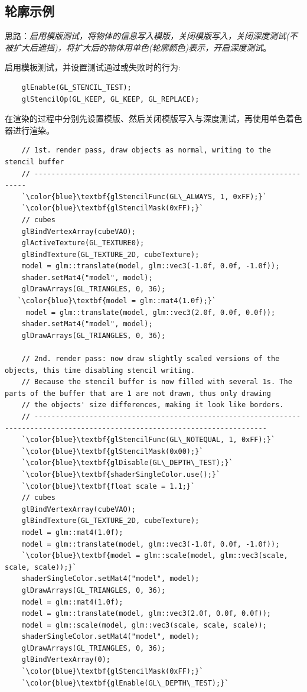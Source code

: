 \documentclass[UTF8,a4paper,12pt]{ctexbook}
\begin{document}
		\subsection{轮廓示例}
			思路：\textit{启用模版测试，将物体的信息写入模版，关闭模版写入，关闭深度测试(不被扩大后遮挡)，将扩大后的物体用单色(轮廓颜色)表示，开启深度测试}。
		
			
			启用模板测试，并设置测试通过或失败时的行为:	
			\begin{lstlisting}
	glEnable(GL_STENCIL_TEST);
	glStencilOp(GL_KEEP, GL_KEEP, GL_REPLACE);			
			\end{lstlisting}
			
			在渲染的过程中分别先设置模版、然后关闭模版写入与深度测试，再使用单色着色器进行渲染。
			\begin{lstlisting}
    // 1st. render pass, draw objects as normal, writing to the stencil buffer
    // --------------------------------------------------------------------
    `\color{blue}\textbf{glStencilFunc(GL\_ALWAYS, 1, 0xFF);}`
    `\color{blue}\textbf{glStencilMask(0xFF);}`
    // cubes
    glBindVertexArray(cubeVAO);
    glActiveTexture(GL_TEXTURE0);
    glBindTexture(GL_TEXTURE_2D, cubeTexture);
    model = glm::translate(model, glm::vec3(-1.0f, 0.0f, -1.0f));
    shader.setMat4("model", model);
    glDrawArrays(GL_TRIANGLES, 0, 36);
   `\color{blue}\textbf{model = glm::mat4(1.0f);}`
     model = glm::translate(model, glm::vec3(2.0f, 0.0f, 0.0f));
    shader.setMat4("model", model);
    glDrawArrays(GL_TRIANGLES, 0, 36);

    // 2nd. render pass: now draw slightly scaled versions of the objects, this time disabling stencil writing.
    // Because the stencil buffer is now filled with several 1s. The parts of the buffer that are 1 are not drawn, thus only drawing 
    // the objects' size differences, making it look like borders.
    // -----------------------------------------------------------------------------------------------------------------------------
    `\color{blue}\textbf{glStencilFunc(GL\_NOTEQUAL, 1, 0xFF);}`
    `\color{blue}\textbf{glStencilMask(0x00);}`
    `\color{blue}\textbf{glDisable(GL\_DEPTH\_TEST);}`
    `\color{blue}\textbf{shaderSingleColor.use();}`
    `\color{blue}\textbf{float scale = 1.1;}`
    // cubes
    glBindVertexArray(cubeVAO);
    glBindTexture(GL_TEXTURE_2D, cubeTexture);
    model = glm::mat4(1.0f);
    model = glm::translate(model, glm::vec3(-1.0f, 0.0f, -1.0f));
    `\color{blue}\textbf{model = glm::scale(model, glm::vec3(scale, scale, scale));}`
    shaderSingleColor.setMat4("model", model);
    glDrawArrays(GL_TRIANGLES, 0, 36);
    model = glm::mat4(1.0f);
    model = glm::translate(model, glm::vec3(2.0f, 0.0f, 0.0f));
    model = glm::scale(model, glm::vec3(scale, scale, scale));
    shaderSingleColor.setMat4("model", model);
    glDrawArrays(GL_TRIANGLES, 0, 36);
    glBindVertexArray(0);
    `\color{blue}\textbf{glStencilMask(0xFF);}`
    `\color{blue}\textbf{glEnable(GL\_DEPTH\_TEST);}`				
			\end{lstlisting}
			
\end{document}
